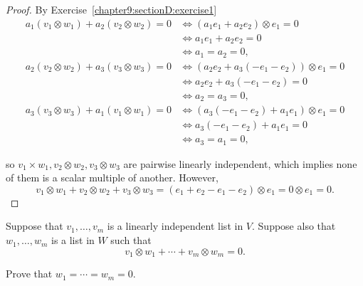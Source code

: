 \begin{proof}
    By Exercise~\ref{chapter9:sectionD:exercise1}
    \begin{align*}
        a_{1}(v_{1}\otimes w_{1}) + a_{2}(v_{2}\otimes w_{2}) = 0 & \Longleftrightarrow (a_{1}e_{1} + a_{2}e_{2})\otimes e_{1} = 0          \\
                                                                  & \Longleftrightarrow a_{1}e_{1} + a_{2}e_{2} = 0                         \\
                                                                  & \Longleftrightarrow a_{1} = a_{2} = 0,                                  \\
        a_{2}(v_{2}\otimes w_{2}) + a_{3}(v_{3}\otimes w_{3}) = 0 & \Longleftrightarrow (a_{2}e_{2} + a_{3}(-e_{1}-e_{2}))\otimes e_{1} = 0 \\
                                                                  & \Longleftrightarrow a_{2}e_{2} + a_{3}(-e_{1}-e_{2}) = 0                \\
                                                                  & \Longleftrightarrow a_{2} = a_{3} = 0,                                  \\
        a_{3}(v_{3}\otimes w_{3}) + a_{1}(v_{1}\otimes w_{1}) = 0 & \Longleftrightarrow (a_{3}(-e_{1}-e_{2}) + a_{1}e_{1})\otimes e_{1} = 0 \\
                                                                  & \Longleftrightarrow a_{3}(-e_{1}-e_{2}) + a_{1}e_{1} = 0                \\
                                                                  & \Longleftrightarrow a_{3} = a_{1} = 0,
    \end{align*}

    so $v_{1}\times w_{1}, v_{2}\otimes w_{2}, v_{3}\otimes w_{3}$ are pairwise linearly independent, which implies none of them is a scalar multiple of another. However,
    \[
        v_{1}\otimes w_{1} + v_{2}\otimes w_{2} + v_{3}\otimes w_{3} = (e_{1} + e_{2} - e_{1} - e_{2})\otimes e_{1} = 0\otimes e_{1} = 0.
    \]
\end{proof}
\newpage

\begin{exercise}\label{chapter9:sectionD:exercise3}
    Suppose that $v_{1}, \ldots, v_{m}$ is a linearly independent list in $V$. Suppose also that $w_{1}, \ldots, w_{m}$ is a list in $W$ such that
    \[
        v_{1}\otimes w_{1} + \cdots + v_{m}\otimes w_{m} = 0.
    \]

    Prove that $w_{1} = \cdots = w_{m} = 0$.
\end{exercise}

